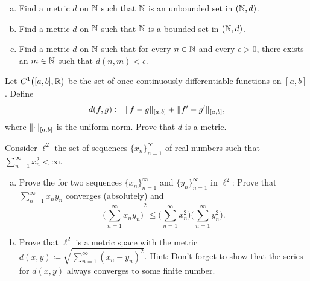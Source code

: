 \begin{exercise}
\leavevmode
\begin{enumerate}[a)]
\item
Find a metric $d$ on ${\mathbb{N}}$ such that ${\mathbb{N}}$ is an unbounded set in $({\mathbb{N}},d)$.
\item
Find a metric $d$ on ${\mathbb{N}}$ such that ${\mathbb{N}}$ is a bounded set in $({\mathbb{N}},d)$.
\item
Find a metric $d$ on ${\mathbb{N}}$ such that for every $n \in {\mathbb{N}}$ and every $\epsilon > 0$,
there exists an $m \in {\mathbb{N}}$ such that $d(n,m) < \epsilon$.
\end{enumerate}
\end{exercise}

\begin{exercise} \label{exercise:C1ab}
Let $C^1\bigl([a,b],{\mathbb{R}}\bigr)$ be the set of once continuously differentiable
functions on $[a,b]$.
Define
\begin{equation*}
d(f,g) \coloneqq \lVert {f-g} \rVert_{[a,b]} + \lVert {f'-g'} \rVert_{[a,b]},
\end{equation*}
where $\lVert {\cdot} \rVert_{[a,b]}$ is the uniform norm.  Prove that $d$ is a metric.
\end{exercise}

\begin{samepage}
\begin{exercise}
Consider $\ell^2$ the set of sequences $\{ x_n \}_{n=1}^\infty$
of real numbers
such that $\sum_{n=1}^\infty x_n^2 < \infty$.
\begin{enumerate}[a)]
\item
Prove the  for two sequences
$\{x_n \}_{n=1}^\infty$ and $\{ y_n \}_{n=1}^\infty$ in $\ell^2$:  Prove that
$\sum_{n=1}^\infty x_n y_n$ converges (absolutely) and
\begin{equation*}
{\biggl( \sum_{n=1}^\infty x_n y_n \biggr)}^2
\leq
\biggl(\sum_{n=1}^\infty x_n^2 \biggr)
\biggl(\sum_{n=1}^\infty y_n^2 \biggr) .
\end{equation*}
\item
Prove that $\ell^2$ is a metric space with the metric
$d(x,y) \coloneqq \sqrt{\sum_{n=1}^\infty {(x_n-y_n)}^2}$.
Hint: Don't forget to show that the series for $d(x,y)$ always converges
to some finite number.
\end{enumerate}
\end{exercise}
\end{samepage}


